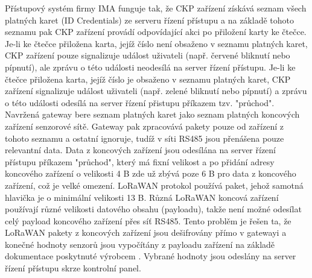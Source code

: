 Přístupový systém firmy IMA funguje tak, že CKP zařízení získává seznam všech platných karet (ID Credentials) ze serveru řízení přístupu a na základě tohoto seznamu pak CKP zařízení provádí odpovídající akci po přiložení karty ke čtečce. 
Je-li ke čtečce přiložena karta, jejíž číslo není obsaženo v seznamu platných karet, CKP zařízení pouze signalizuje událost uživateli (např. červené bliknutí nebo pípnutí), ale zprávu o této události neodesílá na server řízení přístupu. Je-li ke čtečce přiložena karta, jejíž číslo je obsaženo v seznamu platných karet, CKP zařízení signalizuje událost uživateli (např. zelené bliknutí nebo pípnutí) a zprávu o této události odesílá na server řízení přistupu příkazem tzv. "průchod".
Navržená gateway bere seznam platných karet jako seznam platných koncových zařízení senzorové sítě. Gateway pak zpracovává pakety pouze od zařízení z tohoto seznamu a ostatní ignoruje, tudíž v síti RS485 jsou přenášena pouze relevantní data.
Data z koncových zařízení jsou odesílána na server řízení přístupu příkazem "průchod", který má fixní velikost a po přidání adresy koncového zařízení o velikosti 4 B zde už zbývá poze 6 B pro data z koncového zařízení, což je velké omezení.
LoRaWAN protokol používá paket, jehož samotná hlavička je o minimální velikosti 13 B. 
Různá LoRaWAN koncová zařízení používají různé velikosti datového obsahu (payloadu), takže není možné odesílat celý payload koncového zařízení přes síť RS485.
Tento problěm je řešen ta, že LoRaWAN pakety z koncových zařízení jsou dešifrovány přímo v gatewayi a konečné hodnoty senzorů jsou vypočítány z payloadu zařízení na základě dokumentace poskytnuté výrobcem \cite{RHF1S001 pdf}. Vybrané hodnoty jsou odeslány na server řízení přístupu skrze kontrolní panel. 


